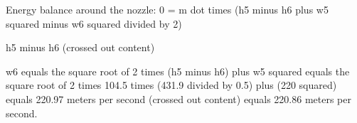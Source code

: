 Energy balance around the nozzle:
0 = m dot times (h5 minus h6 plus w5 squared minus w6 squared divided by 2)

h5 minus h6 (crossed out content)

w6 equals the square root of 2 times (h5 minus h6) plus w5 squared equals the square root of 2 times 104.5 times (431.9 divided by 0.5) plus (220 squared) equals 220.97 meters per second (crossed out content) equals 220.86 meters per second.